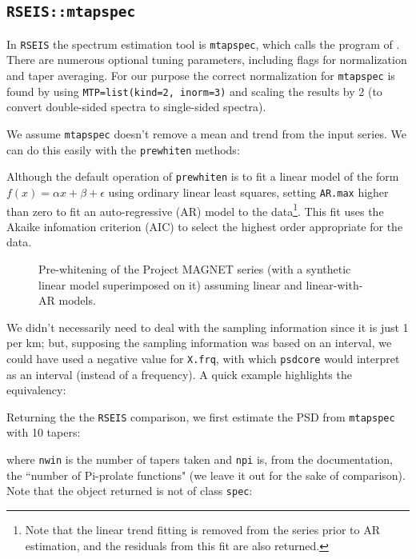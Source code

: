 \documentclass[10pt]{article}\usepackage[]{graphicx}\usepackage[]{color}
\newcommand{\Rcmd}[1]{\texttt{#1}}
\begin{document}
\subsection{\Rcmd{RSEIS::mtapspec}}

In \Rcmd{RSEIS} the spectrum estimation tool is \Rcmd{mtapspec}, which
calls the program of \citet{lees1995}.
There are numerous optional tuning parameters, including
flags for
normalization and taper averaging.  
For our
purpose the correct normalization for \Rcmd{mtapspec} is found
by using
\Rcmd{MTP=list(kind=2, inorm=3)} and scaling the results by 2 (to convert
double-sided spectra to single-sided spectra).

We assume \Rcmd{mtapspec} doesn't remove a mean and trend from the
input series.  We can do this easily with the \Rcmd{prewhiten} methods:


Although the 
default operation of  \Rcmd{prewhiten} is to fit a linear model of the form 
$f(x) = \alpha x + \beta + \epsilon$
using ordinary linear least squares,
setting \Rcmd{AR.max} higher than zero
to fit an auto-regressive (AR) model to the data\footnote{Note that 
the linear trend fitting is removed from the series prior to AR estimation,
and the residuals from this fit are also returned.
}.  
This fit uses the Akaike infomation criterion (AIC) to select
the highest order appropriate for the data.


\label{sxn:prew}

\begin{figure}[!htbp]
\begin{center}

\caption{Pre-whitening of the Project MAGNET series (with a
synthetic linear model superimposed on it) assuming linear and linear-with-AR models.
}
\label{fig:magd}
\end{center}
\end{figure}

We didn't necessarily need to deal with the sampling information since it is just 1 per km;
but, supposing the sampling information was based on an interval, we
could have used
a negative value for \Rcmd{X.frq}, 
with which \Rcmd{psdcore}
would interpret as
an interval (instead of a frequency). 
A quick example highlights the equivalency:


Returning the the \Rcmd{RSEIS} comparison, we first 
estimate the PSD from \Rcmd{mtapspec} with 10 tapers:

where \Rcmd{nwin} is the number of tapers taken and
\Rcmd{npi} is, from the documentation, the ``number of Pi-prolate functions" (we
leave it out for the sake of comparison). 
Note that the object returned
is not of class \Rcmd{spec}:

\end{document}
